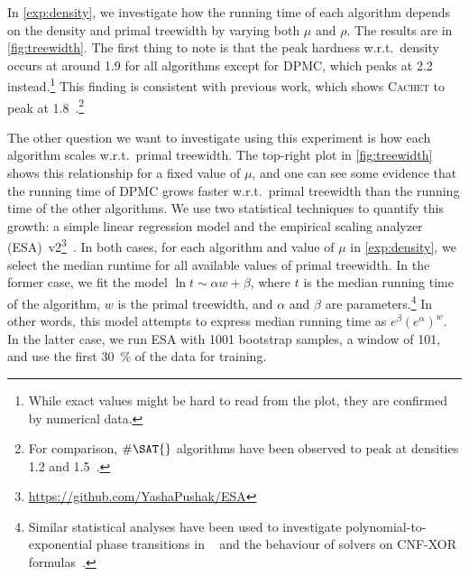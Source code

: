 \documentclass[runningheads]{llncs}
\begin{document}
In \cref{exp:density}, we investigate how the running time of each algorithm
depends on the density and primal treewidth by varying both $\mu$ and $\rho$.
The results are in \cref{fig:treewidth}. The first thing to note is that the
peak hardness w.r.t.\ density occurs at around 1.9 for all algorithms except for
\textsc{DPMC}, which peaks at 2.2 instead.\footnote{While exact values might be
  hard to read from the plot, they are confirmed by numerical data.} This
finding is consistent with previous work, which shows \textsc{Cachet} to peak at
1.8~\cite{DBLP:conf/sat/SangBBKP04}.\footnote{For comparison, $\#\SAT{}$
  algorithms have been observed to peak at densities 1.2 and
  1.5~\cite{DBLP:conf/aaai/Pehoushek00}.}

The other question we want to investigate using this experiment is how each
algorithm scales w.r.t.\ primal treewidth. The top-right plot in
\cref{fig:treewidth} shows this relationship for a fixed value of $\mu$, and one
can see some evidence that the running time of \textsc{DPMC} grows faster
w.r.t.\ primal treewidth than the running time of the other algorithms. We use
two statistical techniques to quantify this growth: a simple linear regression
model and the empirical scaling analyzer
(ESA)~v2\footnote{\url{https://github.com/YashaPushak/ESA}}~\cite{DBLP:conf/gecco/PushakH20}.
In both cases, for each algorithm and value of $\mu$ in \cref{exp:density}, we
select the median runtime for all available values of primal treewidth. In the
former case, we fit the model $\ln t \sim \alpha w + \beta$, where $t$ is the
median running time of the algorithm, $w$ is the primal treewidth, and $\alpha$
and $\beta$ are parameters.\footnote{Similar statistical analyses have been used
  to investigate polynomial-to-exponential phase transitions in
  \SAT{}~\cite{DBLP:journals/constraints/CoarfaDASV03} and the behaviour of
  \SAT{} solvers on CNF-XOR formulas~\cite{DBLP:conf/ijcai/DudekMV17}.} In other
words, this model attempts to express median running time as
$e^\beta{(e^\alpha)}^w$. In the latter case, we run ESA with 1001 bootstrap
samples, a window of 101, and use the first \SI{30}{\percent} of the data for
training.
\end{document}

